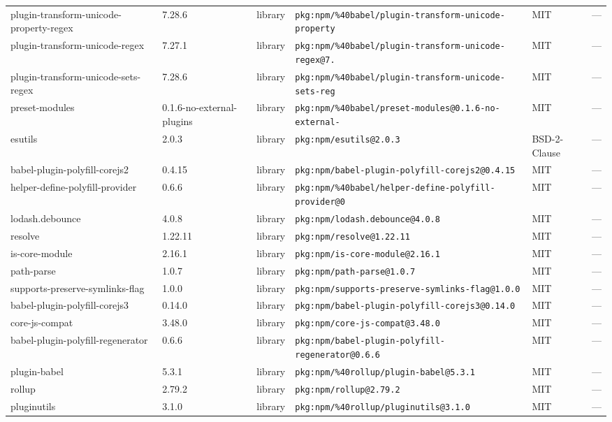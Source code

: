 \documentclass[11pt]{article}
\begin{document}
\begin{longtable}{|l|l|l|p{2.2cm}|l|p{4cm}|}
plugin-transform-unicode-property-regex & 7.28.6 & library & \texttt{pkg:npm/\%40babel/plugin-transform-unicode-property} & MIT & — \\
plugin-transform-unicode-regex & 7.27.1 & library & \texttt{pkg:npm/\%40babel/plugin-transform-unicode-regex@7.} & MIT & — \\
plugin-transform-unicode-sets-regex & 7.28.6 & library & \texttt{pkg:npm/\%40babel/plugin-transform-unicode-sets-reg} & MIT & — \\
preset-modules & 0.1.6-no-external-plugins & library & \texttt{pkg:npm/\%40babel/preset-modules@0.1.6-no-external-} & MIT & — \\
esutils & 2.0.3 & library & \texttt{pkg:npm/esutils@2.0.3} & BSD-2-Clause & — \\
babel-plugin-polyfill-corejs2 & 0.4.15 & library & \texttt{pkg:npm/babel-plugin-polyfill-corejs2@0.4.15} & MIT & — \\
helper-define-polyfill-provider & 0.6.6 & library & \texttt{pkg:npm/\%40babel/helper-define-polyfill-provider@0} & MIT & — \\
lodash.debounce & 4.0.8 & library & \texttt{pkg:npm/lodash.debounce@4.0.8} & MIT & — \\
resolve & 1.22.11 & library & \texttt{pkg:npm/resolve@1.22.11} & MIT & — \\
is-core-module & 2.16.1 & library & \texttt{pkg:npm/is-core-module@2.16.1} & MIT & — \\
path-parse & 1.0.7 & library & \texttt{pkg:npm/path-parse@1.0.7} & MIT & — \\
supports-preserve-symlinks-flag & 1.0.0 & library & \texttt{pkg:npm/supports-preserve-symlinks-flag@1.0.0} & MIT & — \\
babel-plugin-polyfill-corejs3 & 0.14.0 & library & \texttt{pkg:npm/babel-plugin-polyfill-corejs3@0.14.0} & MIT & — \\
core-js-compat & 3.48.0 & library & \texttt{pkg:npm/core-js-compat@3.48.0} & MIT & — \\
babel-plugin-polyfill-regenerator & 0.6.6 & library & \texttt{pkg:npm/babel-plugin-polyfill-regenerator@0.6.6} & MIT & — \\
plugin-babel & 5.3.1 & library & \texttt{pkg:npm/\%40rollup/plugin-babel@5.3.1} & MIT & — \\
rollup & 2.79.2 & library & \texttt{pkg:npm/rollup@2.79.2} & MIT & — \\
pluginutils & 3.1.0 & library & \texttt{pkg:npm/\%40rollup/pluginutils@3.1.0} & MIT & — \\

\end{longtable}
\end{document}
